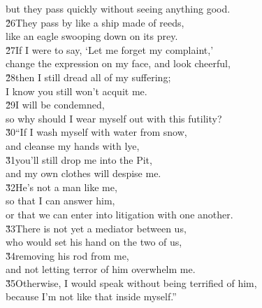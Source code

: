 \begin{poetry}
\poemll    but they pass quickly without seeing anything good. \\
\poeml \v{26}They pass by like a ship made of reeds, \\
\poemll    like an eagle swooping down on its prey. \\
\poeml \v{27}If I were to say, `Let me forget my complaint,' \\
\poemll    change the expression on my face, and look cheerful, \\
\poeml \v{28}then I still dread all of my suffering; \\
\poemll    I know you still won't acquit me. \\
\poeml \v{29}I will be condemned, \\
\poemll    so why should I wear myself out with this futility? \\
\poeml \v{30}``If I wash myself with water from snow, \\
\poemll    and cleanse my hands with lye, \\
\poeml \v{31}you'll still drop me into the Pit, \\
\poemll    and my own clothes will despise me. \\
\poeml \v{32}He's not a man like me, \\
\poemll    so that I can answer him, \\
\poemlll       or that we can enter into litigation with one another. \\
\poeml \v{33}There is not yet a mediator between us, \\
\poemll    who would set his hand on the two of us, \\
\poeml \v{34}removing his rod from me, \\
\poemll    and not letting terror of him overwhelm me. \\
\poeml \v{35}Otherwise, I would speak without being terrified of him, \\
\poemll    because I'm not like that inside myself.''
\end{poetry}

